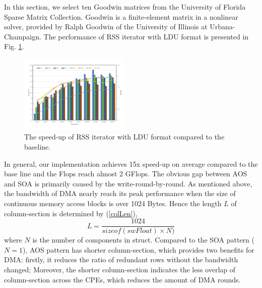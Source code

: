 \documentclass[conference]{IEEEtran}
\begin{document}
In this section, we select ten Goodwin matrices from the University of Florida Sparse Matrix Collection. Goodwin is a finite-element matrix in a nonlinear solver, provided by Ralph Goodwin of the University of Illinois at Urbana-Champaign. The performance of RSS iterator with LDU format is presented in Fig. \ref{rssldu}.
\begin{figure}[tbp]
\centerline{\includegraphics[width=0.47\textwidth]{rss(ldu).pdf}}
\caption{The speed-up of RSS iterator with LDU format compared to the baseline.}
\label{rssldu}
\end{figure}
In general, our implementation achieves 15x speed-up on average compared to the base line and the Flops reach almost 2 GFlops. The obvious gap between AOS and SOA is primarily caused by the write-round-by-round. As mentioned above, the bandwidth of DMA nearly reach its peak performance when the size of continuous memory access blocks is over 1024 Bytes. Hence the length $L$ of column-section is determined by (\ref{colLen}),
\begin{equation}
\label{colLen}
    L=\frac{1024}{sizeof(swFloat)\times N)}
\end{equation}
where $N$ is the number of components in struct.
Compared to the SOA pattern ($N=1$), AOS pattern has shorter column-section, which provides two benefits for DMA: firstly, it reduces the ratio of redundant rows without the bandwidth changed; Moreover, the shorter column-section indicates the less overlap of column-section across the CPEs, which reduces the amount of DMA rounds.
\end{document}
